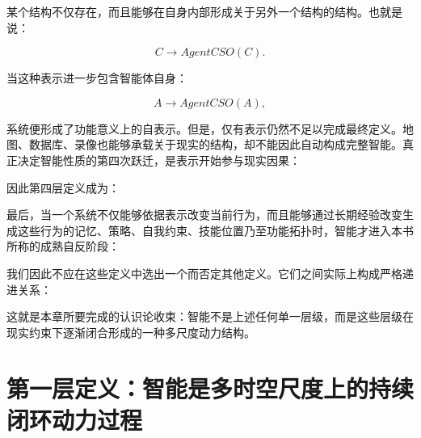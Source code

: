 某个结构不仅存在，而且能够在自身内部形成关于另外一个结构的结构。也就是说：

\[
C
\longrightarrow
AgentCSO(C).
\]

当这种表示进一步包含智能体自身：

\[
A
\longrightarrow
AgentCSO(A),
\]

系统便形成了功能意义上的自表示。但是，仅有表示仍然不足以完成最终定义。地图、数据库、录像也能够承载关于现实的结构，却不能因此自动构成完整智能。真正决定智能性质的第四次跃迁，是表示开始参与现实因果：

\begin{statementbox}
\centering
{}
\end{statementbox}

因此第四层定义成为：

\begin{statementbox}
\centering
{}
\end{statementbox}

最后，当一个系统不仅能够依据表示改变当前行为，而且能够通过长期经验改变生成这些行为的记忆、策略、自我约束、技能位置乃至功能拓扑时，智能才进入本书所称的成熟自反阶段：

\begin{statementbox}
\centering
{}
\end{statementbox}

我们因此不应在这些定义中选出一个而否定其他定义。它们之间实际上构成严格递进关系：

\begin{statementbox}
\centering
{}
\end{statementbox}

这就是本章所要完成的认识论收束：智能不是上述任何单一层级，而是这些层级在现实约束下逐渐闭合形成的一种多尺度动力结构。

\section{第一层定义：智能是多时空尺度上的持续闭环动力过程}

